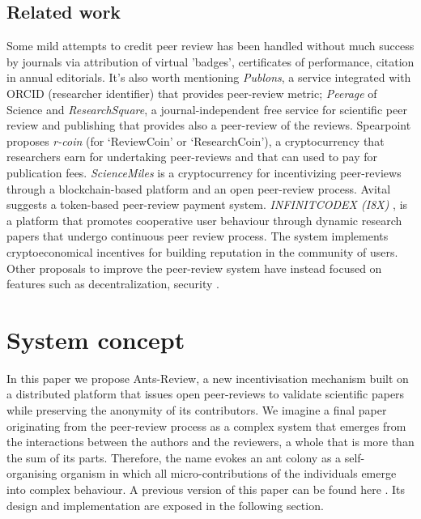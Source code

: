 \documentclass[runningheads]{llncs}
\begin{document}
\subsection{Related work} Some mild attempts to credit peer review has been handled without much success by journals via attribution of virtual 'badges', certificates of performance, citation in annual editorials.
\newline It's also worth mentioning \emph{Publons}\cite{Publons}, a service integrated with ORCID (researcher identifier) that provides peer-review metric; \emph{Peerage} of Science\cite{Peerage} and \emph{ResearchSquare}, a journal-independent free service for scientific peer review and publishing that provides also a peer-review of the reviews. Spearpoint\cite{ResearchCoin} proposes \emph{r-coin} (for ‘ReviewCoin’ or ‘ResearchCoin’), a cryptocurrency that researchers earn for undertaking peer-reviews and that can used to pay for publication fees. \emph{ScienceMiles} \cite{ScienceMiles} is a cryptocurrency for incentivizing peer-reviews through a blockchain-based platform and an open peer-review process. Avital \cite{AvitalToken} suggests a token-based peer-review payment system. \emph{INFINITCODEX (I8X)} \cite{I8X}, is a platform that promotes cooperative user behaviour through dynamic research papers that undergo  continuous peer review process. The system implements cryptoeconomical incentives for building reputation in the community of users. \newline Other proposals to improve the peer-review system have instead focused on features such as decentralization, security \cite{Pevo,CryptSubmit,MarsChain}.

\section{System concept}
In this paper we propose Ants-Review, a new incentivisation mechanism built on a distributed platform that issues open peer-reviews to validate scientific papers while preserving the anonymity of its contributors. We imagine a final paper originating from the peer-review process as a complex system that emerges from the interactions between the authors and the reviewers, a whole that is more than the sum of its parts. Therefore, the name evokes an ant colony as a self-organising organism in which all micro-contributions of the individuals emerge into complex behaviour.
\newline A previous version of this paper can be found here \cite{AntsReview}.
\newline Its design and implementation are exposed in the following section.
\end{document}

